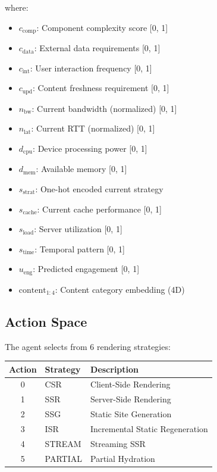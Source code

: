 \documentclass[10pt,twocolumn]{article}
\begin{document}
where:
\begin{itemize}[nosep]
\item $c_{\text{comp}}$: Component complexity score [0, 1]
\item $c_{\text{data}}$: External data requirements [0, 1]
\item $c_{\text{int}}$: User interaction frequency [0, 1]
\item $c_{\text{upd}}$: Content freshness requirement [0, 1]
\item $n_{\text{bw}}$: Current bandwidth (normalized) [0, 1]
\item $n_{\text{lat}}$: Current RTT (normalized) [0, 1]
\item $d_{\text{cpu}}$: Device processing power [0, 1]
\item $d_{\text{mem}}$: Available memory [0, 1]
\item $s_{\text{strat}}$: One-hot encoded current strategy
\item $s_{\text{cache}}$: Current cache performance [0, 1]
\item $s_{\text{load}}$: Server utilization [0, 1]
\item $s_{\text{time}}$: Temporal pattern [0, 1]
\item $u_{\text{eng}}$: Predicted engagement [0, 1]
\item $\text{content}_{1:4}$: Content category embedding (4D)
\end{itemize}

\subsection{Action Space}

The agent selects from 6 rendering strategies:

\begin{table}[h]
\centering
\small
\begin{tabular}{cll}
\toprule
\textbf{Action} & \textbf{Strategy} & \textbf{Description} \\
\midrule
0 & CSR & Client-Side Rendering \\
1 & SSR & Server-Side Rendering \\
2 & SSG & Static Site Generation \\
3 & ISR & Incremental Static Regeneration \\
4 & STREAM & Streaming SSR \\
5 & PARTIAL & Partial Hydration \\
\bottomrule
\end{tabular}
\end{table}
\end{document}
